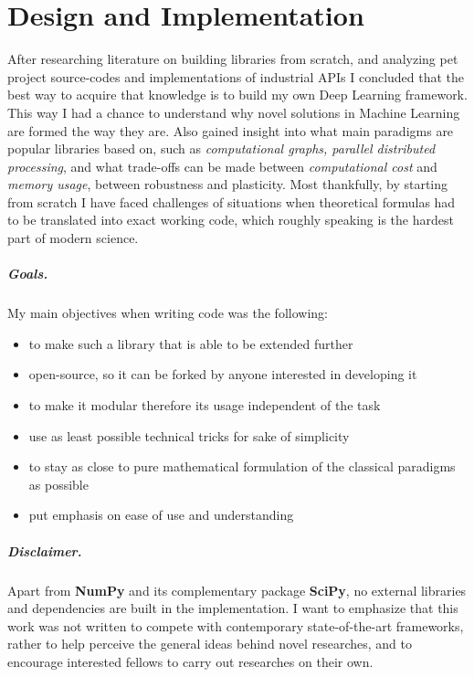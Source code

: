 \chapter{Design and Implementation}

After researching literature on building libraries from scratch, and analyzing pet project source-codes \cite{convnetjs, gibianskysource} and implementations of industrial APIs \cite{TF, caffe, torch}
I concluded that the best way to acquire that knowledge is to build my own Deep Learning framework.
This way I had a chance to understand why novel solutions in Machine Learning are formed the way they are.
Also gained insight into what main paradigms are popular libraries based on, such as \emph{computational graphs, parallel distributed processing}, 
and what trade-offs can be made between \emph{computational cost} and \emph{memory usage}, between robustness and plasticity.
Most thankfully, by starting from scratch I have faced challenges of situations when theoretical formulas had to be translated into exact working code, which roughly speaking is the hardest part of modern science.

\paragraph{Goals.} My main objectives when writing code was the following:
\begin{itemize}
    \item[] to make such a library that is able to be extended further
    \item[] open-source, so it can be forked by anyone interested in developing it
    \item[] to make it modular therefore its usage independent of the task
    \item[] use as least possible technical tricks for sake of simplicity
    \item[] to stay as close to pure mathematical formulation of the classical paradigms as possible
    \item[] put emphasis on ease of use and understanding
\end{itemize}
\paragraph{Disclaimer.} Apart from \textbf{NumPy} and its complementary package \textbf{SciPy}, no external libraries and dependencies are built in the implementation. 
I want to emphasize that this work was not written to compete with contemporary state-of-the-art frameworks, rather to help perceive the general ideas behind novel researches, and to encourage interested fellows to carry out researches on their own.

